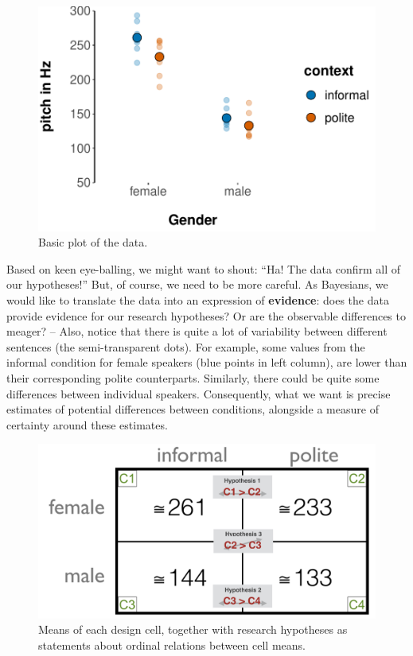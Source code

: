 \documentclass[nobib]{tufte-handout}
\begin{document}
\begin{figure}[t]
  \centering
    \includegraphics[width = \textwidth]{pics/basic_data_plot.pdf}
    \caption{Basic plot of the data.}
     \label{fig:BasicPlotData_data}
\end{figure}

Based on keen eye-balling, we might want to shout: ``Ha! The data confirm all of our
hypotheses!'' But, of course, we need to be more careful. As Bayesians, we would like to
translate the data into an expression of \textbf{evidence}: does the data provide evidence for
our research hypotheses? Or are the observable differences to meager? -- Also, notice that
there is quite a lot of variability between different sentences (the semi-transparent dots).
For example, some values from the informal condition for female speakers (blue points in left
column), are lower than their corresponding polite counterparts. Similarly, there could be
quite some differences between individual speakers. Consequently, what we want is precise
estimates of potential differences between conditions, alongside a measure of certainty around
these estimates.

\begin{figure}[h]
  \centering
    \includegraphics[width = \textwidth]{pics/table_mean_hypotheses.png}
    \caption{Means of each design cell, together with research hypotheses as statements about ordinal relations between cell means.}
    \label{fig:BasicPlotData_table}
\end{figure}
\end{document}
